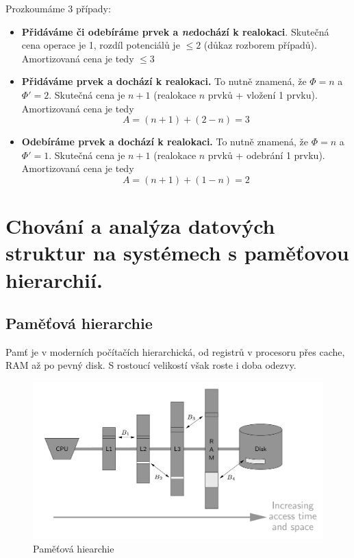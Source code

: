 \documentclass[11pt]{report} %
\numberwithin{equation}{section}
\begin{document}
\begin{itemize}
\begin{enumerate}
		Prozkoumáme 3 případy:
		\begin{itemize}
			\item \textbf{Přidáváme či odebíráme prvek a \textit{ne}dochází k realokaci}. Skutečná cena operace je 1, rozdíl potenciálů je $\leq 2$ (důkaz rozborem případů). Amortizovaná cena je tedy $\leq 3$
			
			\item \textbf{Přidáváme prvek a dochází k realokaci.} To nutně znamená, že $\Phi = n$ a $\Phi' = 2$. Skutečná cena je $n + 1$ (realokace $n$ prvků + vložení 1 prvku). Amortizovaná cena je tedy
			$$A = (n+1) + (2-n) = 3$$
			
			\item \textbf{Odebíráme prvek a dochází k realokaci.} To nutně znamená, že $\Phi = n$ a $\Phi' = 1$. Skutečná cena je $n + 1$ (realokace $n$ prvků + odebrání 1 prvku). Amortizovaná cena je tedy
			$$A = (n+1) + (1-n) = 2$$
		\end{itemize} 
	
	\end{enumerate}
\end{itemize}



\section{Chování a analýza datových struktur na systémech s paměťovou hierarchií.}
\subsection{Paměťová hierarchie}

Pamť je v moderních počítačích hierarchická, od registrů v procesoru přes cache, RAM až po pevný disk. S rostoucí velikostí však roste i doba odezvy. 
\begin{figure}[H]
	\centering\includegraphics[]{img/memory.png}
	\caption{Paměťová hiearchie}
\end{figure}
\end{document}
